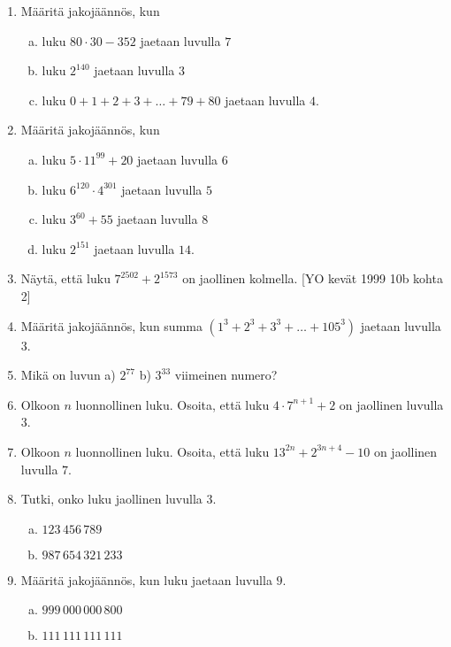 \begin{enumerate}

\item Määritä jakojäännös, kun
\begin{enumerate}[a)]
\item luku $80 \cdot 30 - 352$ jaetaan luvulla $7$
\item luku $2^{140}$ jaetaan luvulla $3$
\item luku $0+1+2+3+ \ldots + 79 + 80$ jaetaan luvulla $4$.
\end{enumerate}

\item Määritä jakojäännös, kun
\begin{enumerate}[a)]
\item luku $5 \cdot 11^{99} + 20$ jaetaan luvulla $6$
\item luku $6^{120} \cdot 4^{301}$ jaetaan luvulla $5$
\item luku $3^{60} + 55$ jaetaan luvulla $8$
\item luku $2^{151}$ jaetaan luvulla $14$.
\end{enumerate}

\item
Näytä, että luku $7^{2502} + 2^{1573}$ on jaollinen kolmella. [YO kevät 1999 10b kohta 2]

\item Määritä jakojäännös, kun summa $(1^3 + 2^3 + 3^3 + \ldots + 105^3)$ jaetaan luvulla $3$.

\item Mikä on luvun a) $2^{77}$ b) $3^{33}$ viimeinen numero?

\item Olkoon $n$ luonnollinen luku. Osoita, että luku $4\cdot 7^{n+1}+2$ on jaollinen luvulla $3$.

\item Olkoon $n$ luonnollinen luku. Osoita, että luku $13^{2n} + 2^{3n+4} - 10$ on jaollinen luvulla $7$.

\item
Tutki, onko luku jaollinen luvulla $3$.
\begin{enumerate}[a)]
\item $123\, 456\, 789$
\item $987\, 654\, 321\, 233$
\end{enumerate}

\item
Määritä jakojäännös, kun luku jaetaan luvulla $9$.
\begin{enumerate}[a)]
\item $999\, 000\, 000\, 800$
\item $111\, 111\, 111\, 111$
\end{enumerate}


\end{enumerate}
